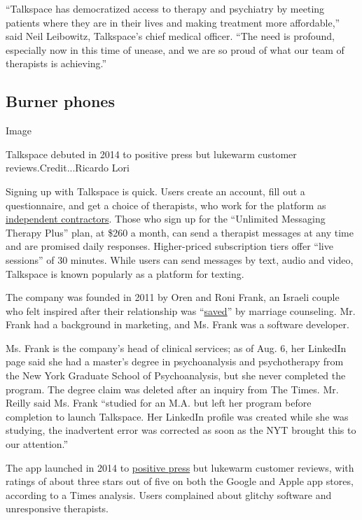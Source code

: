 ``Talkspace has democratized access to therapy and psychiatry by meeting
patients where they are in their lives and making treatment more
affordable,'' said Neil Leibowitz, Talkspace's chief medical officer.
``The need is profound, especially now in this time of unease, and we
are so proud of what our team of therapists is achieving.''

\hypertarget{burner-phones}{%
\subsection{Burner phones}\label{burner-phones}}

Image

Talkspace debuted in 2014 to positive press but lukewarm customer
reviews.Credit...Ricardo Lori

Signing up with Talkspace is quick. Users create an account, fill out a
questionnaire, and get a choice of therapists, who work for the platform
as
\href{https://www.theverge.com/2016/12/19/14004442/talkspace-therapy-app-reviews-patient-safety-privacy-liability-online}{independent
contractors}. Those who sign up for the ``Unlimited Messaging Therapy
Plus'' plan, at \$260 a month, can send a therapist messages at any time
and are promised daily responses. Higher-priced subscription tiers offer
``live sessions'' of 30 minutes. While users can send messages by text,
audio and video, Talkspace is known popularly as a platform for texting.

The company was founded in 2011 by Oren and Roni Frank, an Israeli
couple who felt inspired after their relationship was
``\href{https://blogs.wsj.com/venturecapital/2014/05/12/talkspace-raises-2-5-million-to-deliver-affordable-therapy-online/}{saved}''
by marriage counseling. Mr. Frank had a background in marketing, and Ms.
Frank was a software developer.

Ms. Frank is the company's head of clinical services; as of Aug. 6, her
LinkedIn page said she had a master's degree in psychoanalysis and
psychotherapy from the New York Graduate School of Psychoanalysis, but
she never completed the program. The degree claim was deleted after an
inquiry from The Times. Mr. Reilly said Ms. Frank ``studied for an M.A.
but left her program before completion to launch Talkspace. Her LinkedIn
profile was created while she was studying, the inadvertent error was
corrected as soon as the NYT brought this to our attention.''

The app launched in 2014 to
\href{https://www.theverge.com/2014/6/5/5765732/talkspace-smartphone-therapy-apps}{positive
press} but lukewarm customer reviews, with ratings of about three stars
out of five on both the Google and Apple app stores, according to a
Times analysis. Users complained about glitchy software and unresponsive
therapists.


